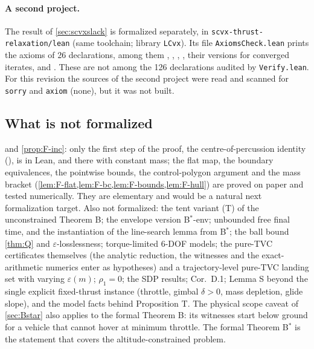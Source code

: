 \paragraph{A second project.} The result of \cref{sec:scvxslack} is formalized separately, in \texttt{scvx-thrust-relaxation/lean}
(same toolchain; library \texttt{LCvx}). Its file \texttt{AxiomsCheck.lean} prints the axioms of 26 declarations, among them
, , , , their versions for
converged iterates, and . These are not among the 126 declarations audited by
\texttt{Verify.lean}. For this revision the sources of the second project were read and scanned for \texttt{sorry} and
\texttt{axiom} (none), but it was not built.

\subsection{What is not formalized}
 and \cref{prop:F-inc}: only the first step of the proof, the centre-of-percussion identity (),
is in Lean, and there with constant mass; the flat map, the boundary equivalences, the pointwise bounds, the control-polygon argument
and the mass bracket (\cref{lem:F-flat,lem:F-bc,lem:F-bounds,lem:F-hull}) are proved on paper and tested numerically. They are
elementary and would be a natural next formalization target. Also not formalized: the tent variant (T) of the unconstrained Theorem B; the envelope version B$^*$-env; unbounded free final time, and the
instantiation of the line-search lemma from B$^*$; the ball bound \cref{thm:Q} and $\varepsilon$-losslessness; torque-limited 6-DOF models; the
pure-TVC certificates themselves (the analytic reduction, the witnesses and the exact-arithmetic numerics enter  as
hypotheses) and a trajectory-level pure-TVC landing set with varying $\varepsilon(m)$; $\rho_1=0$; the SDP results; Cor.~D.1; Lemma S beyond the single explicit fixed-thrust instance (throttle, gimbal $\delta>0$, mass depletion, glide slope), and the
model facts behind Proposition T. The physical scope caveat of \cref{sec:Bstar} also applies to the
formal Theorem B: its witnesses start below ground for a vehicle that cannot hover at minimum throttle. The formal Theorem B$^*$ is
the statement that covers the altitude-constrained problem.
